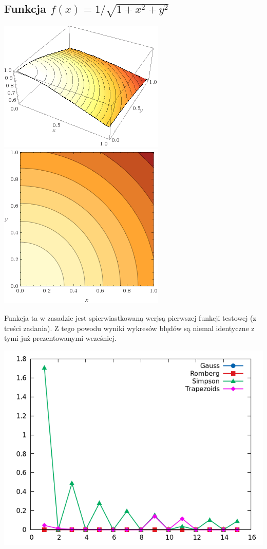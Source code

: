 \documentclass[11pt,leqno]{article}
\begin{document}
\subsection{Funkcja $f(x) = 1 / \sqrt{1 + x^2 + y^2}$}
\begin{center}
\includegraphics[scale=0.65,natwidth=640,natheight=480]{gfx/testa3g.png}
\includegraphics[scale=0.65,natwidth=640,natheight=480]{gfx/testa3p.png}\\
\end{center}

Funkcja ta w zasadzie jest spierwiastkowaną werjsą pierwszej funkcji testowej (z treści zadania). Z tego powodu wyniki wykresów błędów są niemal identyczne z tymi już prezentowanymi wcześniej.

\begin{center}
\includegraphics[scale=0.65,natwidth=640,natheight=480]{plot/testa3_15e.png}
\end{center}
\end{document}
